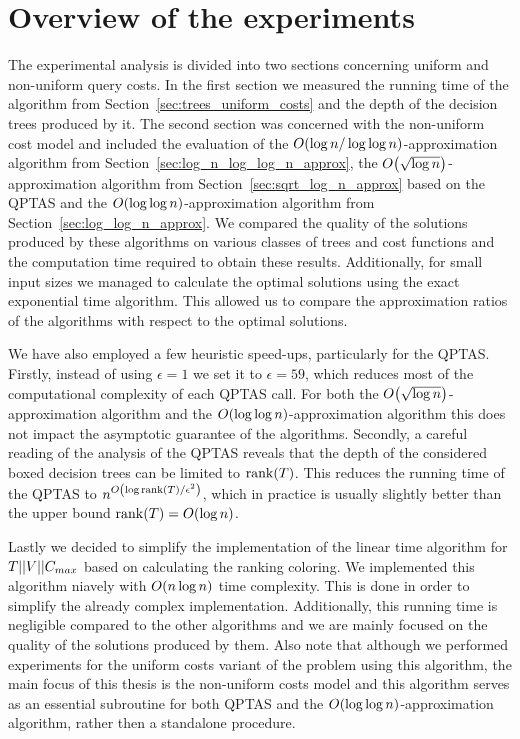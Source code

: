 \newpage
\section{Overview of the experiments}
\label{sec:experiments_overview}

The experimental analysis is divided into two sections concerning uniform and non-uniform query costs. In the first section we measured the running time of the \FRankingBasedDT algorithm from Section~\ref{sec:trees_uniform_costs} and the depth of the decision trees produced by it. The second section was concerned with the non-uniform cost model and included the evaluation of the $O\mathopen{}\left( \log n/\log\log n \right)$-approximation algorithm from Section~\ref{sec:log_n_log_log_n_approx}, the $O\mathopen{}\left( \sqrt{\log n} \right)$-approximation algorithm from Section~\ref{sec:sqrt_log_n_approx} based on the QPTAS and the $O\mathopen{}\left( \log\log n \right)$-approximation algorithm from Section~\ref{sec:log_log_n_approx}. We compared the quality of the solutions produced by these algorithms on various classes of trees and cost functions and the computation time required to obtain these results. Additionally, for small input sizes we managed to calculate the optimal solutions using the exact exponential time algorithm. This allowed us to compare the approximation ratios of the algorithms with respect to the optimal solutions.

We have also employed a few heuristic speed-ups, particularly for the QPTAS. Firstly, instead of using $\epsilon=1$ we set it to $\epsilon=59$, which reduces most of the computational complexity of each QPTAS call. For both the $O\mathopen{}\left( \sqrt{\log n} \right)$-approximation algorithm and the $O\mathopen{}\left( \log\log n \right)$-approximation algorithm this does not impact the asymptotic guarantee of the algorithms. Secondly, a careful reading of the analysis of the QPTAS reveals that the depth of the considered boxed decision trees can be limited to $\operatorname{rank}\mathopen{}\left( T \right)$. This reduces the running time of the QPTAS to $n^{O\mathopen{}\left( \log \operatorname{rank}\mathopen{}\left( T \right)/\epsilon^2 \right)}$, which in practice is usually slightly better than the upper bound $\operatorname{rank}\mathopen{}\left( T \right)=O\mathopen{}\left( \log n \right)$.

Lastly we decided to simplify the implementation of the linear time algorithm for $T||V||C_{max}$ based on calculating the ranking coloring. We implemented this algorithm niavely with $O\mathopen{}\left( n\log n \right)$ time complexity. This is done in order to simplify the already complex implementation. Additionally, this running time is negligible compared to the other algorithms and we are mainly focused on the quality of the solutions produced by them. Also note that although we performed experiments for the uniform costs variant of the problem using this algorithm, the main focus of this thesis is the non-uniform costs model and this algorithm serves as an essential subroutine for both QPTAS and the $O\mathopen{}\left( \log\log n \right)$-approximation algorithm, rather then a standalone procedure.

